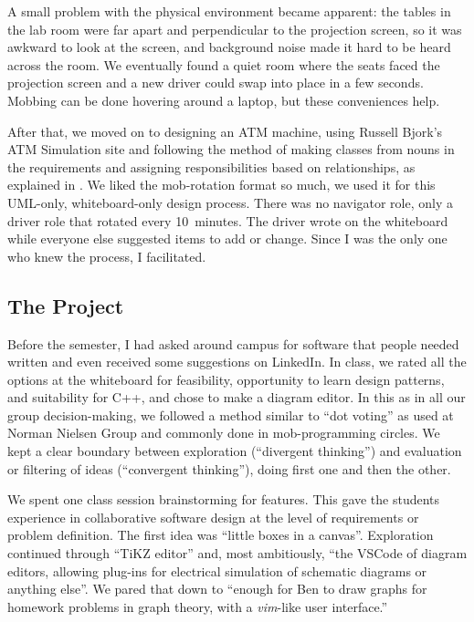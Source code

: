 \documentclass{article}
\begin{document}
A small problem with the physical environment became apparent: the tables in
the lab room were far apart and perpendicular to the projection screen, so it
was awkward to look at the screen, and background noise made it hard to be
heard across the room. We eventually found a quiet room where the seats faced
the projection screen and a new driver could swap into place in a few seconds.
Mobbing can be done hovering around a laptop, but these conveniences help.

After that, we moved on to designing an ATM machine, using Russell Bjork's
ATM Simulation site \cite{bjork_atm_simulation} and following the method of
making classes from nouns in the requirements and assigning responsibilities
based on relationships, as explained in \cite{wirfs1990designing}. We liked
the mob-rotation format so much, we used it for this UML-only, whiteboard-only
design process. There was no navigator role, only a driver role that rotated
every 10~minutes. The driver wrote on the whiteboard while everyone else
suggested items to add or change. Since I was the only one who knew the
process, I facilitated.

\subsection{The Project}

Before the semester, I had asked around campus for software that people needed
written and even received some suggestions on LinkedIn. In class, we rated all
the options at the whiteboard for feasibility, opportunity to learn design
patterns, and suitability for C++, and chose to make a diagram editor. In this
as in all our group decision-making, we followed a method similar to ``dot
voting'' as used at Norman Nielsen Group \cite{budiu2024dotvoting} and
commonly done in mob-programming circles. We kept a clear boundary between
exploration (``divergent thinking'') and evaluation or filtering of ideas
(``convergent thinking''), doing first one and then the other.

We spent one class session brainstorming for features. This gave the
students experience in collaborative software design at the level of
requirements or problem definition. The first idea was ``little boxes in a
canvas''. Exploration continued through ``TiKZ editor'' and, most ambitiously,
``the VSCode of diagram editors, allowing plug-ins for electrical simulation
of schematic diagrams or anything else''. We pared that down to ``enough for
Ben to draw graphs for homework problems in graph theory, with a
\emph{vim}-like user interface.''
\end{document}
